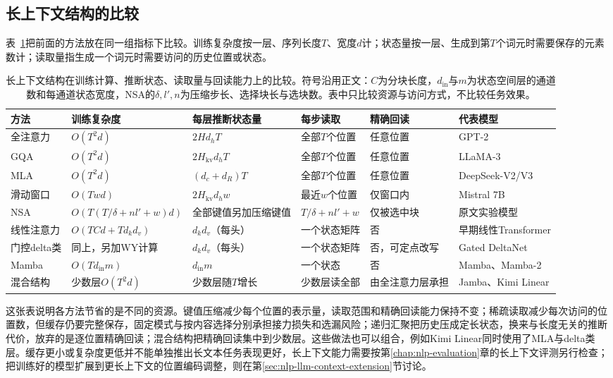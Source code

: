 \subsection{长上下文结构的比较}
\label{sec:nlp-llm-context-comparison}

表~\ref{tab:nlp-llm-context-comparison}把前面的方法放在同一组指标下比较。训练复杂度按一层、序列长度$T$、宽度$d$计；状态量按一层、生成到第$T$个词元时需要保存的元素数计；读取量指生成一个词元时需要访问的历史位置或状态。

\begin{table}[htbp]
 \small
 \begin{tabularx}{\linewidth}{@{}p{17mm}p{27mm}p{30mm}p{23mm}p{21mm}X@{}}
  \toprule
  方法 & 训练复杂度 & 每层推断状态量 & 每步读取 & 精确回读 & 代表模型\\
  \midrule
  全注意力 & $O(T^2d)$ & $2Hd_hT$ & 全部$T$个位置 & 任意位置 & GPT-2\\
  GQA & $O(T^2d)$ & $2H_{\mathrm{kv}}d_hT$ & 全部$T$个位置 & 任意位置 & LLaMA-3\\
  MLA & $O(T^2d)$ & $(d_c+d_R)T$ & 全部$T$个位置 & 任意位置 & DeepSeek-V2/V3\\
  滑动窗口 & $O(Twd)$ & $2H_{\mathrm{kv}}d_hw$ & 最近$w$个位置 & 仅窗口内 & Mistral 7B\\
  NSA & $O(T(T/\delta+nl'+w)d)$ & 全部键值另加压缩键值 & $T/\delta+nl'+w$ & 仅被选中块 & 原文实验模型\\
  线性注意力 & $O(TCd+Td_kd_v)$ & $d_kd_v$（每头） & 一个状态矩阵 & 否 & 早期线性Transformer\\
  门控delta类 & 同上，另加WY计算 & $d_kd_v$（每头） & 一个状态矩阵 & 否，可定点改写 & Gated DeltaNet\\
  Mamba & $O(Td_{\mathrm{in}}m)$ & $d_{\mathrm{in}}m$ & 一个状态 & 否 & Mamba、Mamba-2\\
  混合结构 & 少数层$O(T^2d)$ & 少数层随$T$增长 & 少数层读全部 & 由全注意力层承担 & Jamba、Kimi Linear\\
  \bottomrule
 \end{tabularx}
 \caption{长上下文结构在训练计算、推断状态、读取量与回读能力上的比较。符号沿用正文：$C$为分块长度，$d_{\mathrm{in}}$与$m$为状态空间层的通道数和每通道状态宽度，NSA的$\delta,l',n$为压缩步长、选择块长与选块数。表中只比较资源与访问方式，不比较任务效果。}
 \label{tab:nlp-llm-context-comparison}
\end{table}

这张表说明各方法节省的是不同的资源。键值压缩减少每个位置的表示量，读取范围和精确回读能力保持不变；稀疏读取减少每次访问的位置数，但缓存仍要完整保存，固定模式与按内容选择分别承担接力损失和选漏风险；递归汇聚把历史压成定长状态，换来与长度无关的推断代价，放弃的是逐位置精确回读；混合结构把精确回读集中到少数层。这些做法也可以组合，例如Kimi Linear同时使用了MLA与delta类层。缓存更小或复杂度更低并不能单独推出长文本任务表现更好，长上下文能力需要按第\ref{chap:nlp-evaluation}章的长上下文评测另行检查；把训练好的模型扩展到更长上下文的位置编码调整，则在第\ref{sec:nlp-llm-context-extension}节讨论。
